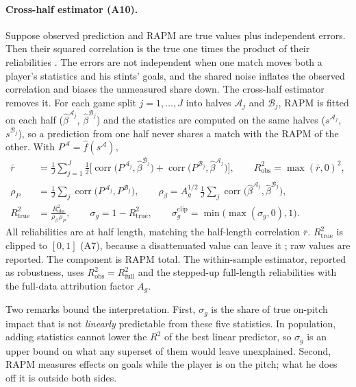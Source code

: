\documentclass[11pt,a4paper]{article}
\DeclareMathOperator{\corr}{corr}
\begin{document}
\paragraph{Cross-half estimator (A10).}
Suppose observed prediction and RAPM are true values plus independent errors.
Then their squared correlation is the true one times the product of their
reliabilities \citep{spearman1904proof}. The errors are not independent when
one match moves both a player's statistics and his stints' goals, and the
shared noise inflates the observed correlation and biases the unmeasured share
down. The cross-half estimator removes it. For each game split
$j = 1, \dots, J$ into halves $\mathcal A_j$ and $\mathcal B_j$, RAPM is fitted on
each half ($\hat\beta^{\mathcal A_j}$, $\hat\beta^{\mathcal B_j}$) and the
statistics are computed on the same halves ($s^{\mathcal A_j}$,
$s^{\mathcal B_j}$), so a prediction from one half never shares a match with the
RAPM of the other. With $P^{\mathcal A} = \hat f(s^{\mathcal A})$,
\begin{align}
  \bar r &= \frac{1}{J}\sum_{j=1}^{J} \tfrac12\Big[\corr\big(P^{\mathcal A_j}, \hat\beta^{\mathcal B_j}\big)
          + \corr\big(P^{\mathcal B_j}, \hat\beta^{\mathcal A_j}\big)\Big],
  \qquad R^2_{\text{obs}} = \max(\bar r, 0)^2,
  \label{eq:cross-r}\\
  \rho_P &= \frac{1}{J}\sum_{j} \corr\big(P^{\mathcal A_j}, P^{\mathcal B_j}\big),
  \qquad
  \rho_\beta = A^{1/2}_g\, \frac{1}{J}\sum_{j} \corr\big(\hat\beta^{\mathcal A_j}, \hat\beta^{\mathcal B_j}\big),
  \label{eq:cross-rel}\\
  R^2_{\text{true}} &= \frac{R^2_{\text{obs}}}{\rho_\beta\, \rho_P},
  \qquad
  \sigma_g = 1 - R^2_{\text{true}}, \qquad \sigma^{\text{clip}}_g = \min\big(\max(\sigma_g, 0), 1\big).
  \label{eq:share}
\end{align}
All reliabilities are at half length, matching the half-length correlation
$\bar r$. $R^2_{\text{true}}$ is clipped to $[0,1]$ (A7), because a
disattenuated value can leave it \citep{charles2005attenuation}; raw values
are reported. The component is RAPM total. The within-sample estimator, reported
as robustness, uses $R^2_{\text{obs}} = R^2_{\text{full}}$ and the stepped-up
full-length reliabilities with the full-data attribution factor $A_g$.

Two remarks bound the interpretation. First, $\sigma_g$ is the share of true
on-pitch impact that is not \emph{linearly} predictable from these five
statistics. In population, adding statistics cannot lower the $R^2$ of the best
linear predictor, so $\sigma_g$ is an upper bound on what any superset of them
would leave unexplained. Second, RAPM measures effects on goals while the
player is on the pitch; what he does off it is outside both sides.
\end{document}
